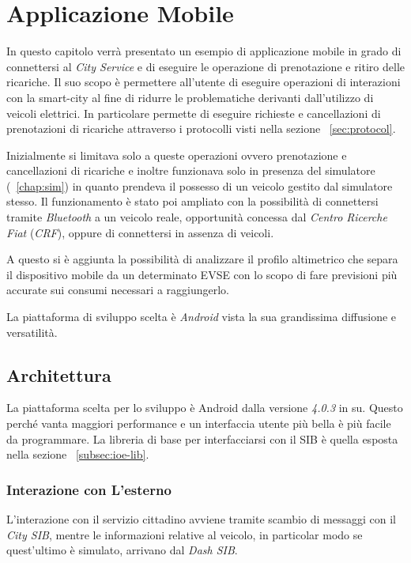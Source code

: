 \chapter{Applicazione Mobile}\label{chap:mobile-app}

In questo capitolo verrà presentato un esempio di applicazione mobile in grado di connettersi al \emph{City Service} e di eseguire le operazione di prenotazione e ritiro delle ricariche. Il suo scopo è permettere all'utente di eseguire operazioni di interazioni con la smart-city al fine di ridurre le problematiche derivanti dall'utilizzo di veicoli elettrici. In particolare permette di eseguire richieste e cancellazioni di prenotazioni di ricariche attraverso i protocolli visti nella sezione ~\ref{sec:protocol}.

Inizialmente si limitava solo a queste operazioni ovvero prenotazione e cancellazioni di ricariche e inoltre funzionava solo in presenza del simulatore (~\ref{chap:sim}) in quanto prendeva il possesso di un veicolo gestito dal simulatore stesso. Il funzionamento è stato poi ampliato con la possibilità di connettersi tramite \emph{Bluetooth} a un veicolo reale, opportunità concessa dal \emph{Centro Ricerche Fiat} (\emph{CRF}), oppure di connettersi in assenza di veicoli.

A questo si è aggiunta la possibilità di analizzare il profilo altimetrico che separa il dispositivo mobile da un determinato EVSE con lo scopo di fare previsioni più accurate sui consumi necessari a raggiungerlo.

La piattaforma di sviluppo scelta è \emph{Android} vista la sua grandissima diffusione e versatilità.

\section{Architettura}

La piattaforma scelta per lo sviluppo è Android dalla versione \emph{4.0.3} in su. Questo perché vanta maggiori performance e un interfaccia utente più bella è più facile da programmare. La libreria di base per interfacciarsi con il SIB è quella esposta nella sezione ~\ref{subsec:ioe-lib}.

\subsection{Interazione con L'esterno}

L'interazione con il servizio cittadino avviene tramite scambio di messaggi con il \emph{City SIB}, mentre le informazioni relative al veicolo, in particolar modo se quest'ultimo è simulato, arrivano dal \emph{Dash SIB}.


